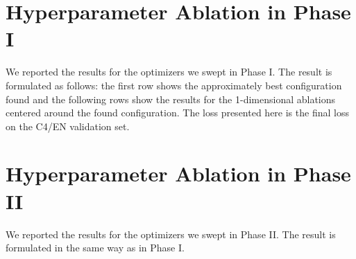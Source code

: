 \section{Hyperparameter Ablation in Phase I}
\label{app:detailed_experiments}

We reported the results for the optimizers we swept in Phase I. The result is formulated as follows: the first row shows the approximately best configuration found and the following rows show the results for the 1-dimensional ablations centered around the found configuration. The loss presented here is the final loss on the C4/EN validation set.














\section{Hyperparameter Ablation in Phase II}
\label{app:detailed_experiments_2}

We reported the results for the optimizers we swept in Phase II. The result is formulated in the same way as in Phase I.












